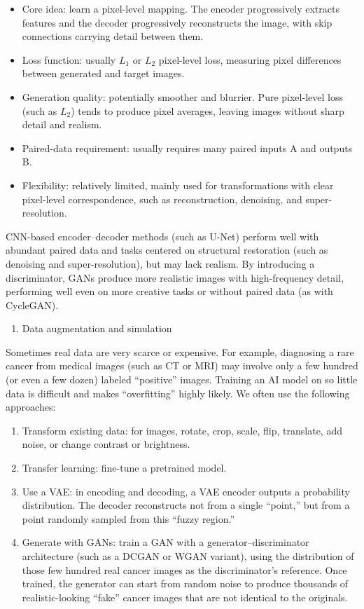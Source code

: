 \begin{itemize}
\tightlist
\item
  Core idea: learn a pixel-level mapping. The encoder progressively extracts features and the decoder progressively reconstructs the image, with skip connections carrying detail between them.
\item
  Loss function: usually \(L_1\) or \(L_2\) pixel-level loss, measuring pixel differences between generated and target images.
\item
  Generation quality: potentially smoother and blurrier. Pure pixel-level loss (such as \(L_2\)) tends to produce pixel averages, leaving images without sharp detail and realism.
\item
  Paired-data requirement: usually requires many paired inputs A and outputs B.
\item
  Flexibility: relatively limited, mainly used for transformations with clear pixel-level correspondence, such as reconstruction, denoising, and super-resolution.
\end{itemize}

CNN-based encoder--decoder methods (such as U-Net) perform well with abundant paired data and tasks centered on structural restoration (such as denoising and super-resolution), but may lack realism. By introducing a discriminator, GANs produce more realistic images with high-frequency detail, performing well even on more creative tasks or without paired data (as with CycleGAN).

\begin{enumerate}
\def\labelenumi{\arabic{enumi}.}
\setcounter{enumi}{2}
\tightlist
\item
  Data augmentation and simulation
\end{enumerate}

Sometimes real data are very scarce or expensive. For example, diagnosing a rare cancer from medical images (such as CT or MRI) may involve only a few hundred (or even a few dozen) labeled ``positive'' images. Training an AI model on so little data is difficult and makes ``overfitting'' highly likely. We often use the following approaches:

\begin{enumerate}
\def\labelenumi{(\arabic{enumi})}
\item
  Transform existing data: for images, rotate, crop, scale, flip, translate, add noise, or change contrast or brightness.
\item
  Transfer learning: fine-tune a pretrained model.
\item
  Use a VAE: in encoding and decoding, a VAE encoder outputs a probability distribution. The decoder reconstructs not from a single ``point,'' but from a point randomly sampled from this ``fuzzy region.''
\item
  Generate with GANs: train a GAN with a generator--discriminator architecture (such as a DCGAN or WGAN variant), using the distribution of those few hundred real cancer images as the discriminator's reference. Once trained, the generator can start from random noise to produce thousands of realistic-looking ``fake'' cancer images that are not identical to the originals.
\end{enumerate}

